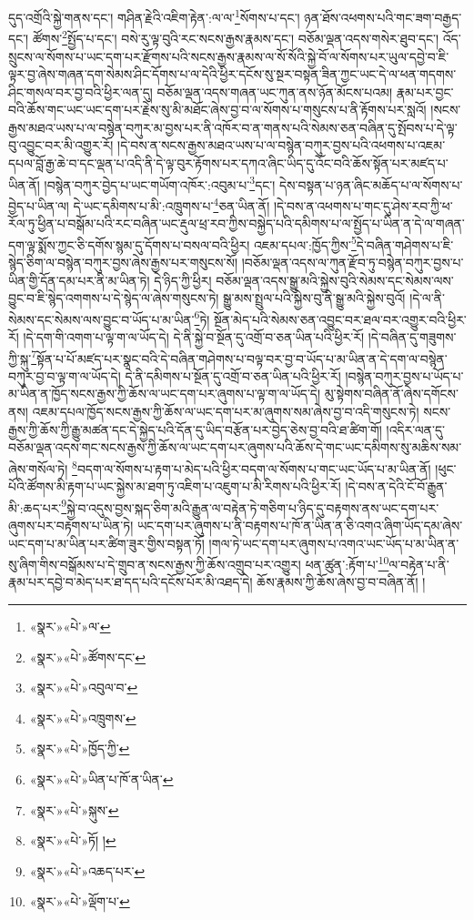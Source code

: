 དུད་འགྲོའི་སྐྱེ་གནས་དང་། གཤིན་རྗེའི་འཇིག་རྟེན་:ལ་ལ་\footnote{«སྣར་»«པེ་»ལ་}སོགས་པ་དང་། ཉན་ཐོས་འཕགས་པའི་གང་ཟག་བརྒྱད་དང་། ཚོགས་\footnote{«སྣར་»«པེ་»ཚོགས་དང་}སྤྱོད་པ་དང་། བསེ་རུ་ལྟ་བུའི་རང་སངས་རྒྱས་རྣམས་དང་། བཅོམ་ལྡན་འདས་གསེར་ཐུབ་དང་། འོད་སྲུངས་ལ་སོགས་པ་ཡང་དག་པར་རྫོགས་པའི་སངས་རྒྱས་རྣམས་ལ་སོ་སོའི་སྐྱེ་བོ་ལ་སོགས་པར་ཡུལ་དབྱེ་བ་ཇི་ལྟར་བྱ་ཞེས་གཞན་དག་སེམས་ཤིང་དོགས་པ་ལ་དེའི་ཕྱིར་དངོས་སུ་སྔར་བསྟན་ཟིན་ཀྱང་ཡང་དེ་ལ་ཕན་གདགས་ཤིང་གསལ་བར་བྱ་བའི་ཕྱིར་ལན་དུ། བཅོམ་ལྡན་འདས་གཞན་ཡང་ཀུན་ནས་ཉོན་མོངས་པའམ། རྣམ་པར་བྱང་བའི་ཆོས་གང་ཡང་ཡང་དག་པར་རྗེས་སུ་མི་མཐོང་ཞེས་བྱ་བ་ལ་སོགས་པ་གསུངས་པ་ནི་རྟོགས་པར་སླའོ། །སངས་རྒྱས་མཐའ་ཡས་པ་ལ་བསྙེན་བཀུར་མ་བྱས་པར་ནི་འཁོར་བ་ན་གནས་པའི་སེམས་ཅན་བཞིན་དུ་སྤོབས་པ་དེ་ལྟ་བུ་འབྱུང་བར་མི་འགྱུར་རོ། །དེ་བས་ན་སངས་རྒྱས་མཐའ་ཡས་པ་ལ་བསྙེན་བཀུར་བྱས་པའི་འཕགས་པ་འཇམ་དཔལ་བློ་རྒྱ་ཆེ་བ་དང་ལྡན་པ་འདི་ནི་དེ་ལྟ་བུར་རྟོགས་པར་དཀའ་ཞིང་ཡིད་དུ་འོང་བའི་ཆོས་སྟོན་པར་མཛད་པ་ཡིན་ནོ། །བསྙེན་བཀུར་བྱེད་པ་ཡང་གཡོག་འཁོར་:འབུམ་པ་\footnote{«སྣར་»«པེ་»འབུལ་བ་}དང་། དེས་བསྟན་པ་ཉན་ཞིང་མཆོད་པ་ལ་སོགས་པ་བྱེད་པ་ཡིན་ལ། དེ་ཡང་དམིགས་པ་མི་:འཁྲུགས་པ་\footnote{«སྣར་»«པེ་»འཁྲུགས་}ཅན་ཡིན་ནོ། །དེ་བས་ན་འཕགས་པ་གང་དུ་ཤེས་རབ་ཀྱི་ཕ་རོལ་ཏུ་ཕྱིན་པ་བསྒོམ་པའི་རང་བཞིན་ཡང་རྡུལ་ཕྲ་རབ་ཀྱིས་བསྐྱེད་པའི་དམིགས་པ་ལ་སྤྱོད་པ་ཡིན་ན་དེ་ལ་གཞན་དག་ལྟ་སྨོས་ཀྱང་ཅི་དགོས་སྙམ་དུ་དོགས་པ་བསལ་བའི་ཕྱིར། འཇམ་དཔལ་:ཁྱོད་ཀྱིས་\footnote{«སྣར་»«པེ་»ཁྱོད་ཀྱི་}དེ་བཞིན་གཤེགས་པ་ཇི་སྙེད་ཅིག་ལ་བསྙེན་བཀུར་བྱས་ཞེས་རྒྱས་པར་གསུངས་སོ། །བཅོམ་ལྡན་འདས་ལ་ཀུན་རྫོབ་ཏུ་བསྙེན་བཀུར་བྱས་པ་ཡིན་གྱི་དོན་དམ་པར་ནི་མ་ཡིན་ཏེ། དེ་ཉིད་ཀྱི་ཕྱིར། བཅོམ་ལྡན་འདས་སྒྱུ་མའི་སྐྱེས་བུའི་སེམས་དང་སེམས་ལས་བྱུང་བ་ཇི་སྙེད་འགགས་པ་དེ་སྙེད་ལ་ཞེས་གསུངས་ཏེ། སྒྱུ་མས་སྤྲུལ་པའི་སྐྱེས་བུ་ནི་སྒྱུ་མའི་སྐྱེས་བུའོ། །དེ་ལ་ནི་སེམས་དང་སེམས་ལས་བྱུང་བ་ཡོད་པ་མ་ཡིན་\footnote{«སྣར་»«པེ་»ཡིན་པ་ཁོ་ན་ཡིན་}ཏེ། སྔོན་མེད་པའི་སེམས་ཅན་འབྱུང་བར་ཐལ་བར་འགྱུར་བའི་ཕྱིར་རོ། །དེ་དག་གི་འགག་པ་ལྟ་ག་ལ་ཡོད་དེ། དེ་ནི་སྐྱེ་བ་སྔོན་དུ་འགྲོ་བ་ཅན་ཡིན་པའི་ཕྱིར་རོ། །དེ་བཞིན་དུ་གཟུགས་ཀྱི་སྐུ་\footnote{«སྣར་»«པེ་»སྐུས་}སྟོན་པ་པོ་མཛད་པར་སྣང་བའི་དེ་བཞིན་གཤེགས་པ་བལྟ་བར་བྱ་བ་ཡོད་པ་མ་ཡིན་ན་དེ་དག་ལ་བསྙེན་བཀུར་བྱ་བ་ལྟ་ག་ལ་ཡོད་དེ། དེ་ནི་དམིགས་པ་སྔོན་དུ་འགྲོ་བ་ཅན་ཡིན་པའི་ཕྱིར་རོ། །བསྙེན་བཀུར་བྱས་པ་ཡོད་པ་མ་ཡིན་ན་ཁྱོད་སངས་རྒྱས་ཀྱི་ཆོས་ལ་ཡང་དག་པར་ཞུགས་པ་ལྟ་ག་ལ་ཡོད་དེ། མུ་སྟེགས་བཞིན་ནོ་ཞེས་དགོངས་ནས། འཇམ་དཔལ་ཁྱོད་སངས་རྒྱས་ཀྱི་ཆོས་ལ་ཡང་དག་པར་མ་ཞུགས་སམ་ཞེས་བྱ་བ་འདི་གསུངས་ཏེ། སངས་རྒྱས་ཀྱི་ཆོས་ཀྱི་རྒྱུ་མཚན་དང་དེ་སྐྱེད་པའི་དོན་དུ་ཡིད་བརྩོན་པར་བྱེད་ཅེས་བྱ་བའི་ཐ་ཚིག་གོ། །འདིར་ལན་དུ་བཅོམ་ལྡན་འདས་གང་སངས་རྒྱས་ཀྱི་ཆོས་ལ་ཡང་དག་པར་ཞུགས་པའི་ཆོས་དེ་གང་ཡང་དམིགས་སུ་མཆིས་སམ་ཞེས་གསོལ་ཏེ། \footnote{«སྣར་»«པེ་»ཏོ། ། }བདག་ལ་སོགས་པ་རྟག་པ་མེད་པའི་ཕྱིར་བདག་ལ་སོགས་པ་གང་ཡང་ཡོད་པ་མ་ཡིན་ནོ། །ཕུང་པོའི་ཚོགས་མི་རྟག་པ་ཡང་སྐྱེས་མ་ཐག་ཏུ་འཇིག་པ་འཇུག་པ་མི་རིགས་པའི་ཕྱིར་རོ། །དེ་བས་ན་དེའི་ངོ་བོ་རྒྱུན་མི་:ཆད་པར་\footnote{«སྣར་»«པེ་»འཆད་པར་}སྐྱེ་བ་འདུས་བྱས་སྐད་ཅིག་མའི་རྒྱུན་ལ་བརྟེན་ཏེ་གཅིག་པ་ཉིད་དུ་བརྟགས་ནས་ཡང་དག་པར་ཞུགས་པར་བརྟགས་པ་ཡིན་ཏེ། ཡང་དག་པར་ཞུགས་པ་ནི་བརྟགས་པ་ཁོ་ན་ཡིན་ན་ཅི་འགའ་ཞིག་ཡོད་དམ་ཞེས་ཡང་དག་པ་མ་ཡིན་པར་ཚིག་ཟུར་གྱིས་བསྟན་ཏོ། །གལ་ཏེ་ཡང་དག་པར་ཞུགས་པ་འགའ་ཡང་ཡོད་པ་མ་ཡིན་ན་སུ་ཞིག་གིས་བསྒོམས་པ་དེ་གྲུབ་ན་སངས་རྒྱས་ཀྱི་ཆོས་འགྲུབ་པར་འགྱུར། ཕན་ཚུན་:རྟོག་པ་\footnote{«སྣར་»«པེ་»ལྡོག་པ་}ལ་བརྟེན་པ་ནི་རྣམ་པར་དབྱེ་བ་མེད་པར་ཐ་དད་པའི་དངོས་པོར་མི་འཐད་དེ། ཆོས་རྣམས་ཀྱི་ཆོས་ཞེས་བྱ་བ་བཞིན་ནོ། །
